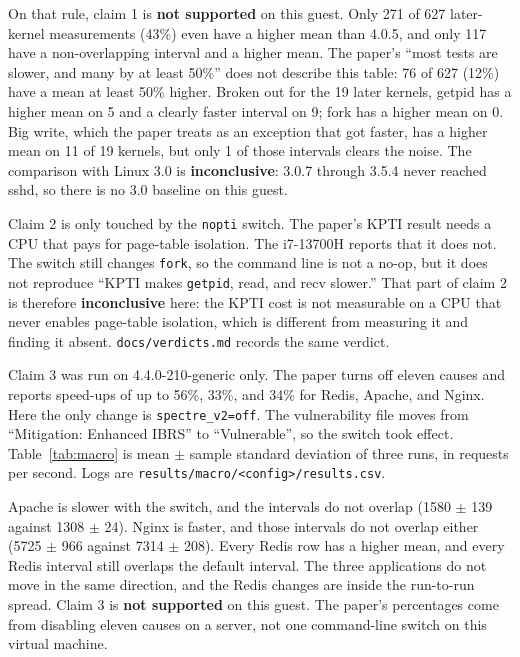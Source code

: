 \documentclass[11pt]{article}
\begin{document}
On that rule, claim 1 is \textbf{not supported} on this guest. Only 271 of 627 later-kernel measurements (43\%) even have a higher mean than 4.0.5, and only 117 have a non-overlapping interval and a higher mean. The paper's ``most tests are slower, and many by at least 50\%'' does not describe this table: 76 of 627 (12\%) have a mean at least 50\% higher. Broken out for the 19 later kernels, getpid has a higher mean on 5 and a clearly faster interval on 9; fork has a higher mean on 0. Big write, which the paper treats as an exception that got faster, has a higher mean on 11 of 19 kernels, but only 1 of those intervals clears the noise. The comparison with Linux 3.0 is \textbf{inconclusive}: 3.0.7 through 3.5.4 never reached sshd, so there is no 3.0 baseline on this guest.

Claim 2 is only touched by the \texttt{nopti} switch. The paper's KPTI result needs a CPU that pays for page-table isolation. The i7-13700H reports that it does not. The switch still changes \texttt{fork}, so the command line is not a no-op, but it does not reproduce ``KPTI makes \texttt{getpid}, read, and recv slower.'' That part of claim 2 is therefore \textbf{inconclusive} here: the KPTI cost is not measurable on a CPU that never enables page-table isolation, which is different from measuring it and finding it absent. \texttt{docs/verdicts.md} records the same verdict.

Claim 3 was run on 4.4.0-210-generic only. The paper turns off eleven causes and reports speed-ups of up to 56\%, 33\%, and 34\% for Redis, Apache, and Nginx. Here the only change is \texttt{spectre\_v2=off}. The vulnerability file moves from ``Mitigation: Enhanced IBRS'' to ``Vulnerable'', so the switch took effect. Table~\ref{tab:macro} is mean $\pm$ sample standard deviation of three runs, in requests per second. Logs are \texttt{results/macro/<config>/results.csv}.

\begin{table}[ht]
\centering
\caption{Application throughput on one kernel. Ratio is the \texttt{spectre\_v2=off} mean divided by the default mean.}
\label{tab:macro}

\end{table}

Apache is slower with the switch, and the intervals do not overlap (1580 $\pm$ 139 against 1308 $\pm$ 24). Nginx is faster, and those intervals do not overlap either (5725 $\pm$ 966 against 7314 $\pm$ 208). Every Redis row has a higher mean, and every Redis interval still overlaps the default interval. The three applications do not move in the same direction, and the Redis changes are inside the run-to-run spread. Claim 3 is \textbf{not supported} on this guest. The paper's percentages come from disabling eleven causes on a server, not one command-line switch on this virtual machine.
\end{document}
